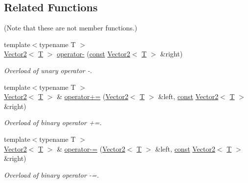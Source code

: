 \subsection*{Related Functions}
(Note that these are not member functions.) \begin{DoxyCompactItemize}
\item 
{\footnotesize template$<$typename T $>$ }\\\hyperlink{classsf_1_1_vector2}{Vector2}$<$ \hyperlink{curses_8priv_8h_a5ef253115820acf7d27f3c5c3b02a0f0}{T} $>$ \hyperlink{classsf_1_1_vector2_a3885c2e66dc427cec7eaa178d59d8e8b}{operator-\/} (\hyperlink{term__entry_8h_a57bd63ce7f9a353488880e3de6692d5a}{const} \hyperlink{classsf_1_1_vector2}{Vector2}$<$ \hyperlink{curses_8priv_8h_a5ef253115820acf7d27f3c5c3b02a0f0}{T} $>$ \&right)
\begin{DoxyCompactList}\small\item\em Overload of unary operator -\/. \end{DoxyCompactList}\item 
{\footnotesize template$<$typename T $>$ }\\\hyperlink{classsf_1_1_vector2}{Vector2}$<$ \hyperlink{curses_8priv_8h_a5ef253115820acf7d27f3c5c3b02a0f0}{T} $>$ \& \hyperlink{classsf_1_1_vector2_ad4b7a9d355d57790bfc7df0ade8bb628}{operator+=} (\hyperlink{classsf_1_1_vector2}{Vector2}$<$ \hyperlink{curses_8priv_8h_a5ef253115820acf7d27f3c5c3b02a0f0}{T} $>$ \&left, \hyperlink{term__entry_8h_a57bd63ce7f9a353488880e3de6692d5a}{const} \hyperlink{classsf_1_1_vector2}{Vector2}$<$ \hyperlink{curses_8priv_8h_a5ef253115820acf7d27f3c5c3b02a0f0}{T} $>$ \&right)
\begin{DoxyCompactList}\small\item\em Overload of binary operator +=. \end{DoxyCompactList}\item 
{\footnotesize template$<$typename T $>$ }\\\hyperlink{classsf_1_1_vector2}{Vector2}$<$ \hyperlink{curses_8priv_8h_a5ef253115820acf7d27f3c5c3b02a0f0}{T} $>$ \& \hyperlink{classsf_1_1_vector2_a30a5a12ad03c9a3a982a0a313bf84e6f}{operator-\/=} (\hyperlink{classsf_1_1_vector2}{Vector2}$<$ \hyperlink{curses_8priv_8h_a5ef253115820acf7d27f3c5c3b02a0f0}{T} $>$ \&left, \hyperlink{term__entry_8h_a57bd63ce7f9a353488880e3de6692d5a}{const} \hyperlink{classsf_1_1_vector2}{Vector2}$<$ \hyperlink{curses_8priv_8h_a5ef253115820acf7d27f3c5c3b02a0f0}{T} $>$ \&right)
\begin{DoxyCompactList}\small\item\em Overload of binary operator -\/=. \end{DoxyCompactList}\item 

\end{DoxyCompactItemize}

